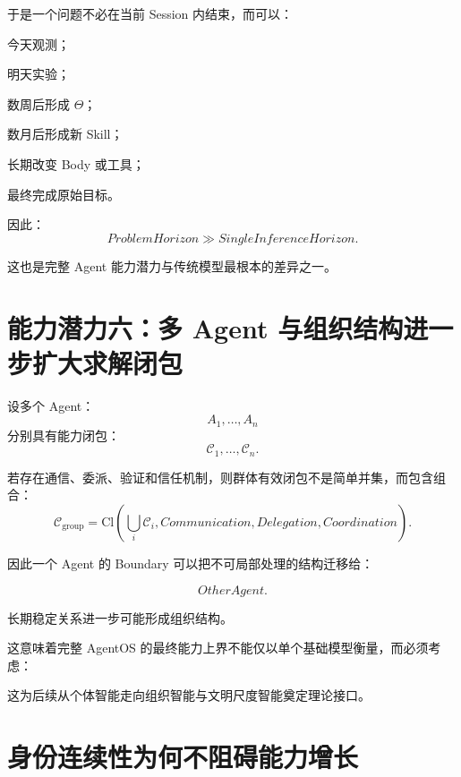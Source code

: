 于是一个问题不必在当前 Session 内结束，而可以：

今天观测；

明天实验；

数周后形成 $\Theta$；

数月后形成新 Skill；

长期改变 Body 或工具；

最终完成原始目标。

因此：
\begin{equation}
\boxed{
ProblemHorizon
\gg
SingleInferenceHorizon.
}
\end{equation}

这也是完整 Agent 能力潜力与传统模型最根本的差异之一。

\section{能力潜力六：多 Agent 与组织结构进一步扩大求解闭包}

设多个 Agent：
\begin{equation}
A_1,\ldots,A_n
\end{equation}
分别具有能力闭包：
\begin{equation}
\mathcal C_1,\ldots,\mathcal C_n.
\end{equation}

若存在通信、委派、验证和信任机制，则群体有效闭包不是简单并集，而包含组合：
\begin{equation}
\mathcal C_{\mathrm{group}}
=
\mathrm{Cl}
\left(
\bigcup_i
\mathcal C_i
,
Communication,
Delegation,
Coordination
\right).
\end{equation}

因此一个 Agent 的 Boundary 可以把不可局部处理的结构迁移给：

\begin{equation}
OtherAgent.
\end{equation}

长期稳定关系进一步可能形成组织结构。

这意味着完整 AgentOS 的最终能力上界不能仅以单个基础模型衡量，而必须考虑：

\begin{statementbox}
\centering
{}
\end{statementbox}

这为后续从个体智能走向组织智能与文明尺度智能奠定理论接口。

\section{身份连续性为何不阻碍能力增长}

